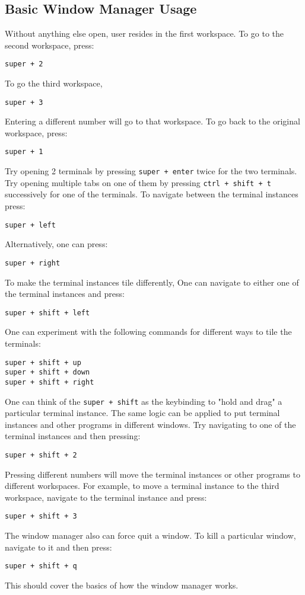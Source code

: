 \documentclass[a4paper, 12pt]{report}
\begin{document}
\begin{center}
\subsection{Basic Window Manager Usage}
\begin{comment}
\end{comment}
Without anything else open, user resides in the first workspace. To go to the second workspace, press:
\begin{lstlisting}
super + 2
\end{lstlisting}
To go the third workspace,
\begin{lstlisting}
super + 3
\end{lstlisting}
Entering a different number will go to that workspace.  To go back to the original workspace, press:
\begin{lstlisting}
super + 1
\end{lstlisting}
Try opening 2 terminals by pressing \texttt{super + enter} twice for the two terminals. Try opening multiple tabs on one of them by pressing \texttt{ctrl + shift + t} successively for one of the terminals. To navigate between the terminal instances press:
\begin{lstlisting}
super + left
\end{lstlisting}
Alternatively, one can press:
\begin{lstlisting}
super + right
\end{lstlisting}
To make the terminal instances tile differently, One can navigate to either one of the terminal instances and press:
\begin{lstlisting}
super + shift + left
\end{lstlisting}
One can experiment with the following commands for different ways to tile the terminals:
\begin{lstlisting}
super + shift + up
super + shift + down
super + shift + right
\end{lstlisting}
One can think of the \texttt{super + shift} as the keybinding to "hold and drag" a particular terminal instance. The same logic can be applied to put terminal instances and other programs in different windows. Try navigating to one of the terminal instances and then pressing:
\begin{lstlisting}
super + shift + 2
\end{lstlisting}
Pressing different numbers will move the terminal instances or other programs to different workspaces. For example, to move a terminal instance to the third workspace, navigate to the terminal instance and press:
\begin{lstlisting}
super + shift + 3
\end{lstlisting}
The window manager also can force quit a window. To kill a particular window, navigate to it and then press:
\begin{lstlisting}
super + shift + q
\end{lstlisting}
This should cover the basics of how the window manager works.


\end{center}
\end{document}

